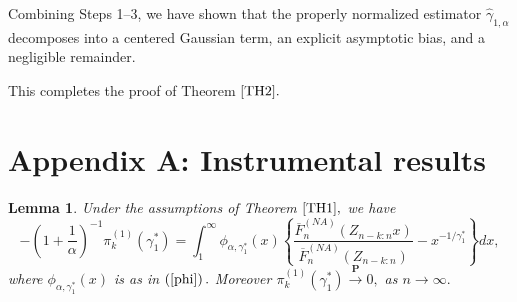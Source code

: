 \documentclass[reqno,openbib,runningheads,a4paper,12pt]{amsart}%
\newtheorem{lemma}{Lemma}[section]
\begin{document}
\noindent Combining Steps 1--3, we have shown that the properly normalized
estimator $\widehat{\gamma}_{1,\alpha}$ decomposes into a centered Gaussian
term, an explicit asymptotic bias, and a negligible remainder.\smallskip

\noindent This completes the proof of Theorem $\ref{TH2}.$

\section{\textbf{Appendix A: Instrumental results}}

\begin{lemma}
\textbf{\label{lemma1}}Under the assumptions of Theorem $\ref{TH1},$ we have
\[
-\left(  1+\frac{1}{\alpha}\right)  ^{-1}\pi_{k}^{\left(  1\right)  }\left(
\gamma_{1}^{\ast}\right)  =\int_{1}^{\infty}\phi_{\alpha,\gamma_{1}^{\ast}%
}\left(  x\right)  \left\{  \frac{\overline{F}_{n}^{\left(  NA\right)
}\left(  Z_{n-k:n}x\right)  }{\overline{F}_{n}^{\left(  NA\right)  }\left(
Z_{n-k:n}\right)  }-x^{-1/\gamma_{1}^{\ast}}\right\}  dx,
\]
where $\phi_{\alpha,\gamma_{1}^{\ast}}\left(  x\right)  $ is as in $\left(
\ref{phi}\right)  .$ Moreover $\pi_{k}^{\left(  1\right)  }\left(  \gamma
_{1}^{\ast}\right)  \overset{\mathbf{P}}{\rightarrow}0,$ as $n\rightarrow
\infty.$
\end{lemma}
\end{document}
